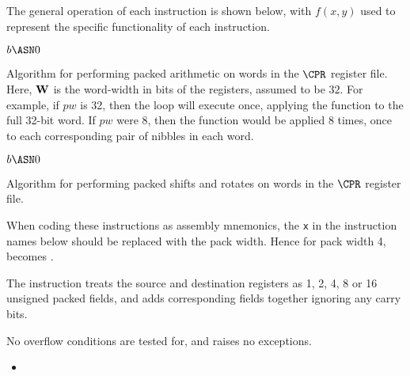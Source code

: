 The general operation of each instruction is shown below, with $f(x,y)$
used to represent the specific functionality of each instruction.

\medskip

\begin{algorithm}
    $b   \ASN 0 $\;
\caption{Algorithm for performing packed arithmetic on words in the 
$\CPR$ register file. Here, ${\bf W}$ is the word-width in bits of the
registers, assumed to be $32$. For example, if $pw$ is 32, then the loop
will execute once, applying the function to the full 32-bit word. If $pw$
were $8$, then the function would be applied $8$ times, once to each
corresponding pair of nibbles in each word.}
\end{algorithm}

\begin{algorithm}
    $b   \ASN 0 $\;
\caption{Algorithm for performing packed shifts and rotates on words in the 
$\CPR$ register file.}
\end{algorithm}

When coding these instructions as assembly mnemonics, the {\tt x} in the
instruction names below should be replaced with the pack width. Hence
for pack width 4,  becomes .

\ienc{\iencaddpx}

The instruction  treats the source and destination registers as
1, 2, 4, 8 or 16 unsigned packed fields, and adds corresponding fields
together ignoring any carry bits.

No overflow conditions are tested for, and  raises no exceptions.

\begin{itemize}
\item {}
\end{itemize}

